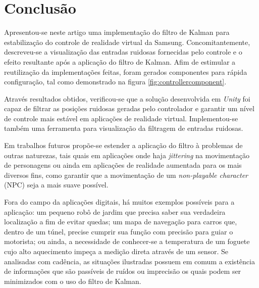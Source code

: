 \documentclass[conference]{IEEEtran}
\begin{document}
\section{Conclusão} \label{sec:conclusion}

Apresentou-se neste artigo uma implementação do filtro de Kalman para estabilização do controle de realidade virtual da Samsung. Concomitantemente, descreveu-se a visualização das entradas ruidosas fornecidas pelo controle e o efeito resultante após a aplicação do filtro de Kalman. Afim de estimular a reutilização da implementações feitas, foram gerados componentes para rápida configuração, tal como demonstrado na figura \ref{fig:controllercomponent}.


Através resultados obtidos, verificou-se que a solução desenvolvida em \textit{Unity} foi capaz de filtrar as posições ruidosas geradas pelo controlador e garantir um nível de controle mais estável em aplicações de realidade virtual. Implementou-se também uma ferramenta para visualização da filtragem de entradas ruidosas.


Em trabalhos futuros propõe-se estender a aplicação do filtro à problemas de outras naturezas, tais quais em aplicações onde haja \textit{jittering} na movimentação de personagens ou ainda em aplicações de realidade aumentada para os mais diversos fins, como garantir que a movimentação de um \textit{non-playable character} (NPC) seja a mais suave possível.


Fora do campo da aplicações digitais, há muitos exemplos possíveis para a aplicação:  um pequeno robô de jardim que precisa saber sua verdadeira localização a fim de evitar quedas; um mapa de navegação para carros que, dentro de um túnel, precise cumprir sua função com precisão para guiar o motorista; ou ainda, a necessidade de conhecer-se a temperatura de um foguete cujo alto aquecimento impeça a medição direta através de um sensor. Se analisadas com cadência, as situações ilustradas possuem em comum a existência de informações que são passíveis de ruídos ou imprecisão os quais podem ser minimizados com o uso do filtro de Kalman.

\end{document}
